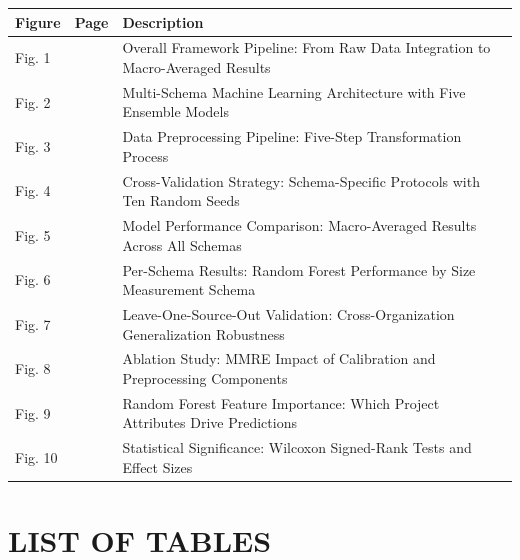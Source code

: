 \documentclass[11pt,a4paper]{article}
\begin{document}
\noindent
\begin{tabular}{|p{}|p{}|p{}|}
\hline
\textbf{\Large Figure} & \textbf{\Large Page} & \textbf{\Large Description} \\
\hline
Fig. 1 & \pageref{fig:pipeline} & Overall Framework Pipeline: From Raw Data Integration to Macro-Averaged Results \\
\hline
Fig. 2 & \pageref{fig:ml-arch} & Multi-Schema Machine Learning Architecture with Five Ensemble Models \\
\hline
Fig. 3 & \pageref{fig:preprocess} & Data Preprocessing Pipeline: Five-Step Transformation Process \\
\hline
Fig. 4 & \pageref{fig:cv-strategy} & Cross-Validation Strategy: Schema-Specific Protocols with Ten Random Seeds \\
\hline
Fig. 5 & \pageref{fig:performance} & Model Performance Comparison: Macro-Averaged Results Across All Schemas \\
\hline
Fig. 6 & \pageref{fig:per-schema} & Per-Schema Results: Random Forest Performance by Size Measurement Schema \\
\hline
Fig. 7 & \pageref{fig:loso} & Leave-One-Source-Out Validation: Cross-Organization Generalization Robustness \\
\hline
Fig. 8 & \pageref{fig:ablation} & Ablation Study: MMRE Impact of Calibration and Preprocessing Components \\
\hline
Fig. 9 & \pageref{fig:feature-importance} & Random Forest Feature Importance: Which Project Attributes Drive Predictions \\
\hline
Fig. 10 & \pageref{fig:statistical-sig} & Statistical Significance: Wilcoxon Signed-Rank Tests and Effect Sizes \\
\hline
\end{tabular}

\vspace{0.3cm}

\newpage

\section*{LIST OF TABLES}

\vspace{0.3cm}
\end{document}
